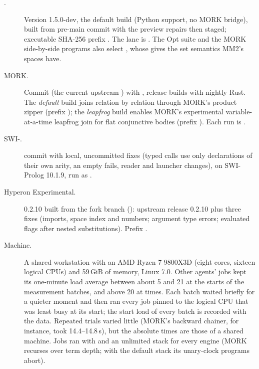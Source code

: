 \begin{description}
\item[\CeTTa{}.] Version 1.5.0-dev, the default build (Python support, no
  MORK bridge), built from pre-main commit  with the preview
  repairs then staged; executable SHA-256 prefix .  The
  \PeTTa{} lane is .  The Opt suite and the MORK
  side-by-side programs also select , whose
   gives the set semantics MM2's spaces have.
\item[MORK.] Commit  (the current upstream ) with
  \PathMap{} , release builds with nightly Rust.  The
  \emph{default} build joins relation by relation through MORK's product
  zipper (prefix ); the \emph{leapfrog} build enables
  MORK's experimental variable-at-a-time leapfrog join for flat conjunctive
  bodies (prefix ).  Each run is
  .
\item[SWI-\PeTTa{}.] \PeTTa{} commit  with local, uncommitted
  fixes (typed calls use only declarations of their own arity, an empty
   fails, reader and launcher changes), on SWI-Prolog 10.1.9,
  run as .
\item[Hyperon Experimental.]  0.2.10 built from the fork
  branch  (): upstream release 0.2.10 plus three
  fixes (imports, space index and numbers; argument type errors; evaluated
  flags after nested substitutions).  Prefix .
\item[Machine.] A shared workstation with an AMD Ryzen 7 9800X3D (eight
  cores, sixteen logical CPUs) and 59\,GiB of memory, Linux 7.0.  Other
  agents' jobs kept its one-minute load average between about 5 and 21 at the
  starts of the measurement batches, and above 20 at times.  Each batch waited briefly for a quieter moment and then
  ran every job pinned to the logical CPU that was least busy at its start; the
  start load of every batch is recorded with the data.  Repeated trials varied
  little (MORK's backward chainer, for instance, took 14.4--14.8\,s), but the
  absolute times are those of a shared machine.  Jobs ran with
   and an unlimited stack for every engine (MORK
  recurses over term depth; with the default stack its unary-clock programs
  abort).
\end{description}

